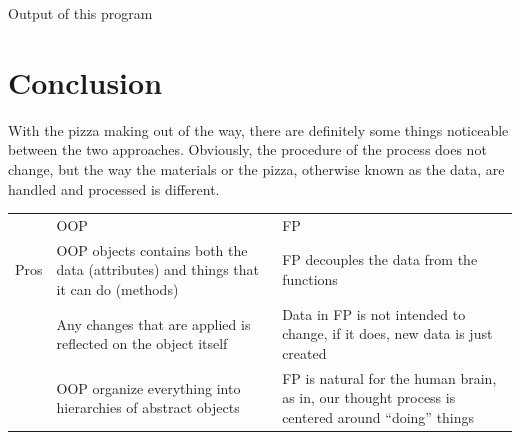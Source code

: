 \documentclass[a4paper]{article}
\numberwithin{equation}{section}
\begin{document}
Output of this program

\newpage
\section{Conclusion}
With the pizza making out of the way, there are definitely some things noticeable between the two approaches.
Obviously, the procedure of the process does not change, but the way the materials or the pizza, otherwise known as the data, are handled and processed is different.

\begin{center}
  \begin{tabularx}{\textwidth}{l*{2}{X}}
    \toprule
         & OOP                                                                                                                                                                                                    & FP                                                                                                                                                             \\
    \cmidrule(lr){2-3}
    Pros & OOP objects contains both the data (attributes) and things that it can do (methods)                                                                                                                    & FP decouples the data from the functions                                                                                                                       \\
         & Any changes that are applied is reflected on the object itself                                                                                                                                         & Data in FP is not intended to change, if it does, new data is just created                                                                                     \\
         & OOP organize everything into hierarchies of abstract objects                                                                                                                                           & FP is natural for the human brain, as in, our thought process is centered around ``doing'' things                                                              \\

\end{tabularx}
\end{center}
\end{document}
